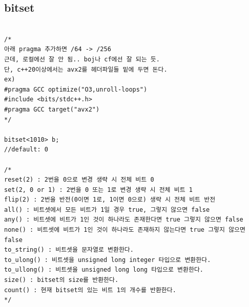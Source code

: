 \documentclass[landscape, 8pt, a4paper, oneside, twocolumn]{extarticle}
\begin{document}
\subsection{bitset}
\begin{verbatim}

/*
아래 pragma 추가하면 /64 -> /256
근데, 로컬에선 잘 안 됨.. boj나 cf에선 잘 되는 듯.
단, c++20이상에서는 avx2를 헤더파일들 밑에 두면 돈다.
ex)
#pragma GCC optimize("O3,unroll-loops")
#include <bits/stdc++.h>
#pragma GCC target("avx2")
*/

bitset<1010> b; 
//default: 0

/*
reset(2) : 2번을 0으로 변경 생략 시 전체 비트 0
set(2, 0 or 1) : 2번을 0 또는 1로 변경 생략 시 전체 비트 1
flip(2) : 2번을 반전(0이면 1로, 1이면 0으로) 생략 시 전체 비트 반전
all() : 비트셋에서 모든 비트가 1일 경우 true, 그렇지 않으면 false
any() : 비트셋에 비트가 1인 것이 하나라도 존재한다면 true 그렇지 않으면 false
none() : 비트셋에 비트가 1인 것이 하나라도 존재하지 않는다면 true 그렇지 않으면 false
to_string() : 비트셋을 문자열로 변환한다.
to_ulong() : 비트셋을 unsigned long integer 타입으로 변환한다.
to_ullong() : 비트셋을 unsigned long long 타입으로 변환한다.
size() : bitset의 size를 반환한다.
count() : 현재 bitset의 있는 비트 1의 개수를 반환한다.
*/
\end{verbatim}
\newpage
\end{document}
